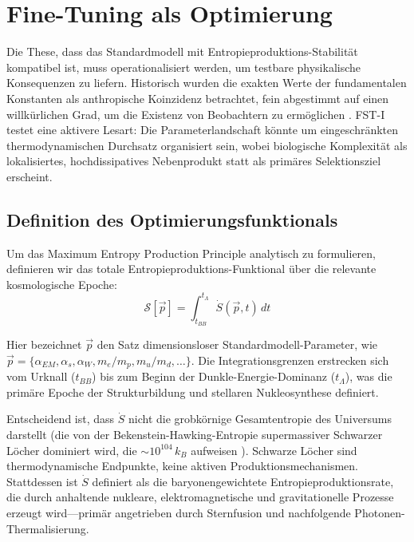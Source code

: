\documentclass[12pt,a4paper]{article}
\theoremstyle{remark}
\begin{document}
\section{Fine-Tuning als Optimierung}
\label{sec:finetuning}

Die These, dass das Standardmodell mit Entropieproduktions-Stabilit\"at kompatibel ist, muss operationalisiert werden, um testbare physikalische Konsequenzen zu liefern. Historisch wurden die exakten Werte der fundamentalen Konstanten als anthropische Koinzidenz betrachtet, fein abgestimmt auf einen willk\"urlichen Grad, um die Existenz von Beobachtern zu erm\"oglichen \citep{Adams2019}. FST-I testet eine aktivere Lesart: Die Parameterlandschaft k\"onnte um eingeschr\"ankten thermodynamischen Durchsatz organisiert sein, wobei biologische Komplexit\"at als lokalisiertes, hochdissipatives Nebenprodukt statt als prim\"ares Selektionsziel erscheint.

\subsection{Definition des Optimierungsfunktionals}

Um das Maximum Entropy Production Principle analytisch zu formulieren, definieren wir das totale Entropieproduktions-Funktional \"uber die relevante kosmologische Epoche:
\begin{equation}
\mathcal{S}[\vec{p}] = \int_{t_{BB}}^{t_\Lambda} \dot{S}(\vec{p}, t) \, dt
\end{equation}

Hier bezeichnet $\vec{p}$ den Satz dimensionsloser Standardmodell-Parameter, wie $\vec{p} = \{\alpha_{EM}, \alpha_s, \alpha_W, m_e/m_p, m_u/m_d, \ldots\}$. Die Integrationsgrenzen erstrecken sich vom Urknall ($t_{BB}$) bis zum Beginn der Dunkle-Energie-Dominanz ($t_\Lambda$), was die prim\"are Epoche der Strukturbildung und stellaren Nukleosynthese definiert.

Entscheidend ist, dass $\dot{S}$ nicht die grobk\"ornige Gesamtentropie des Universums darstellt (die von der Bekenstein-Hawking-Entropie supermassiver Schwarzer L\"ocher dominiert wird, die $\sim 10^{104}\,k_B$ aufweisen \citep{EntropyMaximum}). Schwarze L\"ocher sind thermodynamische Endpunkte, keine aktiven Produktionsmechanismen. Stattdessen ist $\dot{S}$ definiert als die baryonengewichtete Entropieproduktionsrate, die durch anhaltende nukleare, elektromagnetische und gravitationelle Prozesse erzeugt wird---prim\"ar angetrieben durch Sternfusion und nachfolgende Photonen-Thermalisierung.
\end{document}
